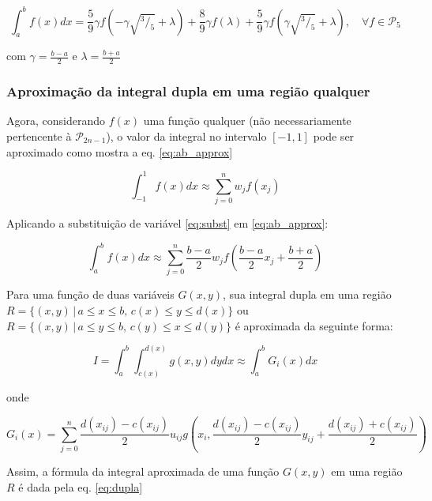 \documentclass[a4,12pt]{horizon-theme}
\begin{document}
\begin{equation}\label{eq:p5_ab_final}
  \displaystyle\int_a^b f(x)dx = \frac{5}{9}\gamma f(-\gamma\sqrt{^3/_5} + \lambda) + \frac{8}{9}\gamma f(\lambda) + \frac{5}{9}\gamma f(\gamma\sqrt{^3/_5} + \lambda),\quad \forall f \in \mathcal{P}_5
\end{equation}

com $\displaystyle\gamma = \frac{b-a}{2}$ e $\displaystyle\lambda = \frac{b+a}{2}$


\subsubsection{Aproximação da integral dupla em uma região qualquer}
Agora, considerando $f(x)$ uma função qualquer (não necessariamente pertencente à $\mathcal{P}_{2n-1}$), o valor da integral no intervalo $[-1, 1]$ pode ser aproximado como mostra a eq. \eqref{eq:ab_approx}

\begin{equation}\label{eq:ab_approx}
  \displaystyle \int_{-1}^{1} f(x)dx \approx \sum_{j=0}^n w_j f(x_j)
\end{equation}

Aplicando a substituição de variável \eqref{eq:subst} em \eqref{eq:ab_approx}:

\begin{equation}
  \displaystyle \int_a^b f(x)dx \approx \sum_{j=0}^n \frac{b-a}{2} w_j f\left(\frac{b-a}{2} x_j + \frac{b+a}{2}\right)
\end{equation}

Para uma função de duas variáveis $G(x,y)$, sua integral dupla em uma região $R = \{(x, y)\,|\,a \le x \le b,\,c(x) \le y \le d(x)\}$ ou $R = \{(x, y)\,|\,a \le y \le b,\,c(y) \le x \le d(y)\}$ é aproximada da seguinte forma:

\begin{equation}
  \displaystyle I = \int_a^b\int_{c(x)}^{d(x)} g(x, y)dydx \approx \int_a^b G_i(x)dx
\end{equation}

onde

\begin{equation}
  G_i(x) = \sum_{j=0}^n \frac{d(x_{ij})-c(x_{ij})}{2} u_{ij} g\left(x_i, \frac{d(x_{ij})-c(x_{ij})}{2} y_{ij} + \frac{d(x_{ij})+c(x_{ij})}{2}\right)
\end{equation}

Assim, a fórmula da integral aproximada de uma função $G(x,y)$ em uma região $R$ é dada pela eq. \eqref{eq:dupla}
\end{document}
